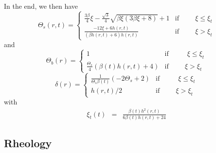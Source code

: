 In the end, we then have
\begin{equation}
  \Theta_s(r,t)=
  \begin{cases}
    \frac{3 \beta}{4} \xi - \frac{\sqrt{3}}{4} \sqrt{\beta \xi \left(3 \beta \xi + 8\right)} + 1 & \text{if} \hspace{1cm} \xi\leq \xi_t \\
    \frac{- 12  \xi +  6 h{\left  (r,t \right  )}}{\left(\beta h{\left
            (r,t  \right  )} +  6\right)  h{\left  (r,t \right  )}}  &
    \text{if} \hspace{1cm} \xi > \xi_t
  \end{cases}
  \label{C4-TS}
\end{equation}
and
\begin{equation}
  \Theta_b(r)=
  \begin{cases}
    1 &\text{if } \hspace{1cm} \xi\leq \xi_t \\
    \frac{\Theta_{s}}{4}  \left(\beta(t)  h{\left  (r,t  \right  )}  +
      4\right) & \text{if} \hspace{1cm} \xi > \xi_t
  \end{cases}
  \label{C4-TB}
\end{equation}
\begin{equation}
  \delta(r)=
  \begin{cases}
    \frac{1}{\Theta_{s} \beta(t)} \left(- 2 \Theta_{s} + 2\right) &\text{if } \hspace{1cm} \xi\leq \xi_t \\
    h(r,t)/2 & \text{if} \hspace{1cm} \xi > \xi_t
  \end{cases}
  \label{C4-DELTA}
\end{equation}
with
\begin{eqnarray}
  \xi_t(t)&=&\frac{\beta(t) h^{2}{\left (r,t \right )}}{6 \beta(t) h{\left (r,t \right )}
              + 24}
\end{eqnarray}

\subsection{Rheology}
\label{C4-sec:rheology}

